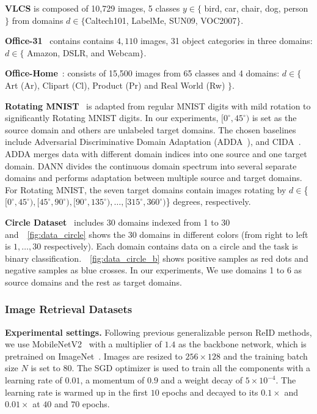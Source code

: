 \documentclass{article} \usepackage{iclr2023_conference,times}
\begin{document}
\noindent\textbf{VLCS} \citep{torralba2011unbiased} is composed of 10,729 images, 5 classes $y \in \{$ bird, car, chair, dog, person $\}$ from domains $d \in \{$Caltech101, LabelMe, SUN09, VOC2007$\}$. 

\noindent\textbf{Office-31}~\citep{saenko2010adapting} contains contains $4,110$ images, 31 object categories in three domains: $d \in \{$ Amazon, DSLR, and Webcam$\}$.


\textbf{Office-Home}~\citep{venkateswara2017deep}: consists of 15,500 images from 65 classes and 4 domains: $d\in\{$ Art (Ar), Clipart (Cl), Product (Pr) and Real World (Rw) $\}$.

\noindent\textbf{Rotating MNIST}~\citep{wang2020continuously} is adapted from regular MNIST digits with mild rotation to significantly Rotating MNIST digits. In our experiments, $[0^\circ,45^\circ)$ is set as the source domain and others are unlabeled target domains. The chosen baselines include Adversarial Discriminative Domain Adaptation (ADDA~\citep{tzeng2017adversarial}), and CIDA~\citep{wang2020continuously}. ADDA merges data with different domain indices into one source and one target domain. DANN divides the continuous domain spectrum into several separate domains and performs adaptation between multiple source and target domains. For Rotating MNIST, the seven target domains contain images rotating by $d\in$\{$[0^\circ,45^\circ),[45^\circ,90^\circ),[90^\circ,135^\circ),\dots,[315^\circ,360^\circ)$\} degrees, respectively.

\noindent\textbf{Circle Dataset}~\citep{wang2020continuously} includes 30 domains indexed from 1 to 30 and~\figurename~\ref{fig:data_circle} shows the 30 domains in different colors (from right to left is $1,\dots,30$ respectively).  Each domain contains data on a circle and the task is binary classification.~\figurename~\ref{fig:data_circle_b} shows positive samples as red dots and negative samples as blue crosses. In our experiments, We use domains 1 to 6 as source domains and the rest as target domains.

\subsubsection{Image Retrieval Datasets}

\textbf{Experimental settings.}
Following previous generalizable person ReID methods, we use MobileNetV2~\citep{sandler2018mobilenetv2} with a multiplier of $1.4$ as the backbone network, which is pretrained on ImageNet~\citep{deng2009imagenet}. Images are resized to $256\times 128$ and the training batch size $N$ is set to $80$. The SGD optimizer is used to train all the components  with a learning rate of $0.01$, a momentum of $0.9$ and a weight decay of $5\times 10^{-4}$. The learning rate is warmed up in the first $10$ epochs and decayed to its $0.1\times$ and $0.01\times$ at $40$ and $70$ epochs.
\end{document}
